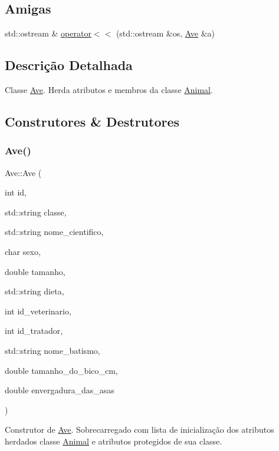\subsection*{Amigas}
\begin{DoxyCompactItemize}
\item 
std\+::ostream \& \hyperlink{classAve_a47c80b591740b49f5f18073dbe9f1fe4}{operator$<$$<$} (std\+::ostream \&os, \hyperlink{classAve}{Ave} \&a)
\end{DoxyCompactItemize}


\subsection{Descrição Detalhada}
Classe \hyperlink{classAve}{Ave}. Herda atributos e membros da classe \hyperlink{classAnimal}{Animal}. 

\subsection{Construtores \& Destrutores}
\mbox{\label{classAve_a7a85f41ae3a0a5722c66b4213c38fd86}} 
\subsubsection{\texorpdfstring{Ave()}{Ave()}}
{\footnotesize\ttfamily Ave\+::\+Ave (\begin{DoxyParamCaption}\item[{int}]{id,  }\item[{std\+::string}]{classe,  }\item[{std\+::string}]{nome\+\_\+cientifico,  }\item[{char}]{sexo,  }\item[{double}]{tamanho,  }\item[{std\+::string}]{dieta,  }\item[{int}]{id\+\_\+veterinario,  }\item[{int}]{id\+\_\+tratador,  }\item[{std\+::string}]{nome\+\_\+batismo,  }\item[{double}]{tamanho\+\_\+do\+\_\+bico\+\_\+cm,  }\item[{double}]{envergadura\+\_\+das\+\_\+asas }\end{DoxyParamCaption})}

Construtor de \hyperlink{classAve}{Ave}. Sobrecarregado com lista de inicialização dos atributos herdados classe \hyperlink{classAnimal}{Animal} e atributos protegidos de sua classe. \mbox{\label{classAve_ad290be8d6fb95f1cfd24b5f55def7741}} 
